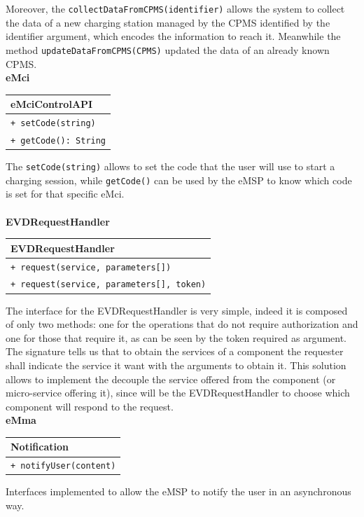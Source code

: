 Moreover, the \verb|collectDataFromCPMS(identifier)| allows the system to collect the data of a new charging station managed by the CPMS identified by the identifier argument, which encodes the information to reach it. Meanwhile the method \verb|updateDataFromCPMS(CPMS)| updated the data of an already known CPMS.\\
\textbf{eMci}\\
\begin{table}[H]
    \centering
    \begin{tabular}{|l|}
        \hline
        \textbf{eMciControlAPI} \\
        \hline
        \verb|+ setCode(string)|\\
        \verb|+ getCode(): String|\\
        \hline
    \end{tabular}
\end{table}
The \verb|setCode(string)| allows to set the code that the user will use to start a charging session, while \verb|getCode()| can be used by the eMSP to know which code is set for that specific eMci.\\
\\
\textbf{EVDRequestHandler}\\
\begin{table}[H]
    \centering
    \begin{tabular}{|l|}
        \hline
        \textbf{EVDRequestHandler} \\
        \hline
        \verb|+ request(service, parameters[])|\\
        \verb|+ request(service, parameters[], token)|\\
        \hline
    \end{tabular}
\end{table}
The interface for the EVDRequestHandler is very simple, indeed it is composed of only two methods: one for the operations that do not require authorization and one for those that require it, as can be seen by the token required as argument. The signature tells us that to obtain the services of a component the requester shall indicate the service it want with the arguments to obtain it. This solution allows to implement the decouple the service offered from the component (or micro-service offering it), since will be the EVDRequestHandler to choose which component will respond to the request.\\

\textbf{eMma}\\
\begin{table}[H]
    \centering
    \begin{tabular}{|l|}
        \hline
        \textbf{Notification} \\
        \hline
        \verb|+ notifyUser(content)|\\
        \hline
    \end{tabular}
\end{table}
Interfaces implemented to allow the eMSP to notify the user in an asynchronous way.
